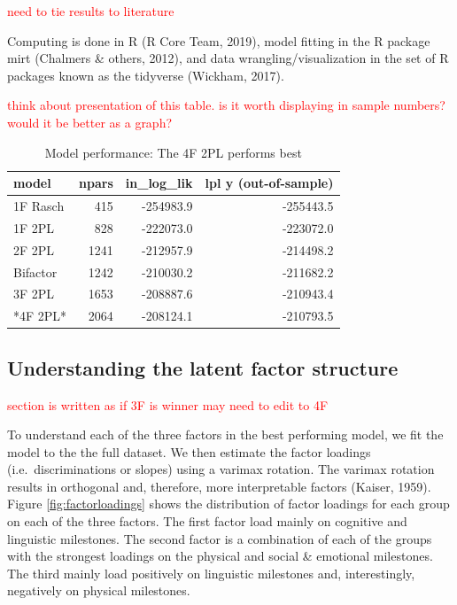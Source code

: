 \documentclass[10pt, letterpaper]{article}
\newenvironment{CodeChunk}{}{}
\begin{document}
\textcolor{red}{need to tie results to literature}

Computing is done in R (R Core Team, 2019), model fitting in the R
package mirt (Chalmers \& others, 2012), and data
wrangling/visualization in the set of R packages known as the tidyverse
(Wickham, 2017).

\textcolor{red}{think about presentation of this table.}
\textcolor{red}{is it worth displaying in sample numbers?}
\textcolor{red}{would it be better as a graph?}

\begin{CodeChunk}
\begin{table}[!h]

\caption{\label{tab:results}Model performance: The 4F 2PL performs best}
\centering
\fontsize{10}{12}\selectfont
\begin{tabular}[t]{l|r|r|r}
\hline
model & npars & in\_log\_lik & lpl y (out-of-sample)\\
\hline
1F Rasch & 415 & -254983.9 & -255443.5\\
\hline
1F 2PL & 828 & -222073.0 & -223072.0\\
\hline
2F 2PL & 1241 & -212957.9 & -214498.2\\
\hline
Bifactor & 1242 & -210030.2 & -211682.2\\
\hline
3F 2PL & 1653 & -208887.6 & -210943.4\\
\hline
*4F 2PL* & 2064 & -208124.1 & -210793.5\\
\hline
\end{tabular}
\end{table}

\end{CodeChunk}

\hypertarget{understanding-the-latent-factor-structure}{%
\subsection{Understanding the latent factor
structure}\label{understanding-the-latent-factor-structure}}

\textcolor{red}{section is written as if 3F is winner}
\textcolor{red}{may need to edit to 4F}

To understand each of the three factors in the best performing model, we
fit the model to the the full dataset. We then estimate the factor
loadings (i.e.~discriminations or slopes) using a varimax rotation. The
varimax rotation results in orthogonal and, therefore, more
interpretable factors (Kaiser, 1959). Figure \ref{fig:factorloadings}
shows the distribution of factor loadings for each group on each of the
three factors. The first factor load mainly on cognitive and linguistic
milestones. The second factor is a combination of each of the groups
with the strongest loadings on the physical and social \& emotional
milestones. The third mainly load positively on linguistic milestones
and, interestingly, negatively on physical milestones.
\end{document}
